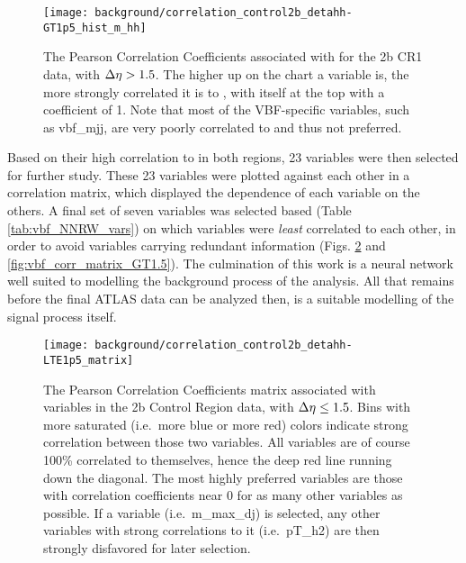     \begin{sidewaysfigure}[tbh]
        \vspace*{6.5in}
        \texttt{[image: background/correlation\_control2b\_detahh-GT1p5\_hist\_m\_hh]}
        \caption{
            The Pearson Correlation Coefficients associated with \mhh for the 2b CR1 data,
                with $\Delta \eta > 1.5$.
            The higher up on the chart a variable is, the more strongly correlated it is to \mhh,
                with \mhh itself at the top with a coefficient of 1.
            Note that most of the VBF-specific variables, such as vbf\_mjj, are very poorly correlated to \mhh and thus not preferred.
        }
        \label{fig:mhh_corrGT1.5}
    \end{sidewaysfigure}

    Based on their high correlation to \mhh in both \deta regions, 23 variables were then selected for further study.
    These 23 variables were plotted against each other in a correlation matrix,
        which displayed the dependence of each variable on the others.
    A final set of seven variables was selected based (Table \ref{tab:vbf_NNRW_vars}) on which variables were \textit{least} correlated to each other,
        in order to avoid variables carrying redundant information (Figs. \ref{fig:vbf_corr_matrix_LT1.5} and \ref{fig:vbf_corr_matrix_GT1.5}).
    The culmination of this work is a neural network well suited to modelling the background process of the analysis.
    All that remains before the final ATLAS data can be analyzed then,
        is a suitable modelling of the signal process itself.

    \begin{figure}[tbh]
        \texttt{[image: background/correlation\_control2b\_detahh-LTE1p5\_matrix]}
        \caption{
            The Pearson Correlation Coefficients matrix associated with variables in the 2b Control Region data,
                with $\Delta \eta \leq 1.5$.
            Bins with more saturated (i.e.\ more blue or more red) colors indicate strong correlation between those two variables.
            All variables are of course 100\% correlated to themselves, hence the deep red line running down the diagonal.
            The most highly preferred variables are those with correlation coefficients near 0 for as many other variables as possible.
            If a variable (i.e.\ m\_max\_dj) is selected, any other variables with strong correlations to it (i.e.\ pT\_h2)
                are then strongly disfavored for later selection.
        }
        \label{fig:vbf_corr_matrix_LT1.5}
    \end{figure}


